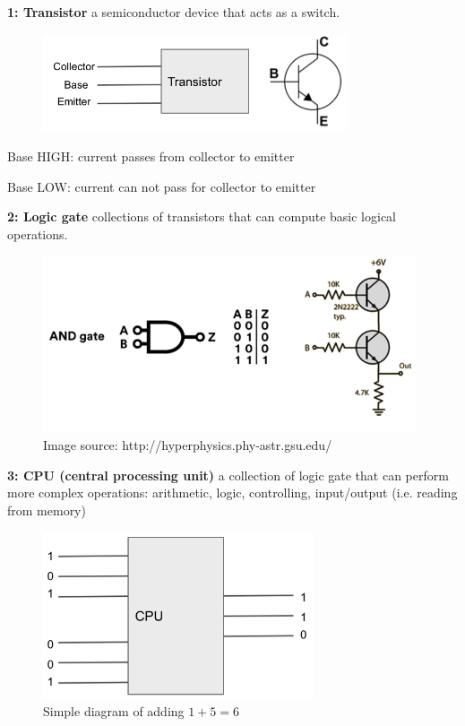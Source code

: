 \documentclass[12pt]{article}
\numberwithin{equation}{section}
\begin{document}
\textbf{1: Transistor} a semiconductor device that acts as a switch.

\begin{figure}[H]
	\centering
	\includegraphics[width=9cm] {tran.png}
\end{figure}
Base HIGH: current passes from collector to emitter

Base LOW: current can not pass for collector to emitter

\textbf{2: Logic gate} collections of transistors that can compute basic logical operations. 

\begin{figure}[H]
	\centering
	\includegraphics[width=11cm] {and.png}
	\caption{Image source: http://hyperphysics.phy-astr.gsu.edu/}
\end{figure}

\textbf{3: CPU (central processing unit)} a collection of logic gate that can perform more complex operations: arithmetic, logic, controlling, input/output (i.e. reading from memory)

\begin{figure}[H]
	\centering
	\includegraphics[width=8cm] {add.png}
	\caption{Simple diagram of adding $1+5=6$}
\end{figure}
\end{document}
